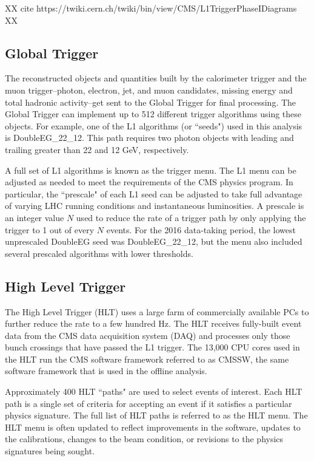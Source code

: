XX cite https://twiki.cern.ch/twiki/bin/view/CMS/L1TriggerPhaseIDiagrams XX 

\subsection{Global Trigger}
The reconstructed objects and quantities built by the calorimeter trigger and the muon trigger--photon, electron, jet, and muon candidates, missing energy and total hadronic activity--get sent to the Global Trigger for final processing. The Global Trigger can implement up to 512 different trigger algorithms using these objects. For example, one of the L1 algorithms (or ``seeds") used in this analysis is DoubleEG\_22\_12.  This path requires two photon objects with leading and trailing \pT greater than 22 and 12 GeV, respectively.

A full set of L1 algorithms is known as the trigger menu. The L1 menu can be adjusted as needed to meet the requirements of the CMS physics program. 
In particular, the ``prescale" of each L1 seed can be adjusted 
to take full advantage of varying LHC running conditions and instantaneous luminosities. 
A prescale is an integer value $N$ used to reduce the rate of a trigger path by only applying the trigger to
1 out of every $N$ events. For the 2016 data-taking period, the lowest unprescaled DoubleEG seed was
DoubleEG\_22\_12, but the menu also included several prescaled algorithms with lower \pT thresholds.


\subsection{High Level Trigger}
\label{HLT}
The High Level Trigger (HLT) uses a large farm of commercially available PCs to further reduce the rate to a few hundred Hz. The HLT receives fully-built event data from the CMS data acquisition system (DAQ) and processes only those bunch crossings that have passed the L1 trigger. The 13,000 CPU cores used in the HLT run the CMS software framework referred to as CMSSW, the same software framework that is used in the offline analysis. 

Approximately 400 HLT ``paths" are used to select events of interest. Each HLT path is a single set of criteria for accepting an event if it satisfies a particular physics signature. The full list of HLT paths is referred to as the HLT menu. The HLT menu is often updated to reflect improvements in the software, updates to the calibrations, changes to the beam condition, or revisions to the physics signatures being sought. 

